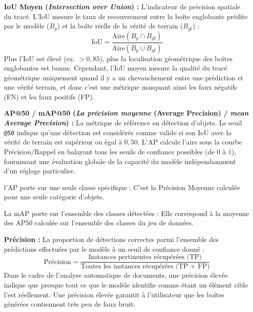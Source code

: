     \begin{description}
    
        \item \textbf{IoU Moyen (\textit{Intersection over Union}) :} L'indicateur de précision spatiale du tracé. L'IoU mesure le taux de recouvrement entre la boîte englobante prédite par le modèle ($B_p$) et la boîte réelle de la vérité de terrain ($B_{gt}$) :
        \begin{equation*}
            \text{IoU} = \frac{\text{Aire}(B_p \cap B_{gt})}{\text{Aire}(B_p \cup B_{gt})}
        \end{equation*}
        Plus l'IoU est élevé (ex. $> 0{,}85$), plus la localisation géométrique des boîtes englobantes est bonne. Cependant, l'IoU moyen mesure la qualité du tracé géométrique uniquement quand il y a un chevauchement entre une prédiction et une vérité terrain, et donc c'est une métrique masquant ainsi les faux négatifs (FN) et les faux positifs (FP). 

        \item \textbf{AP@50 / mAP@50 (\textit{La précision moyenne} (Average Precision) / \textit{mean Average Precision}) :} La métrique de référence en détection d'objets. Le seuil \texttt{@50} indique qu'une détection est considérée comme valide si son IoU avec la vérité de terrain est supérieur ou égal à $0{,}50$. L'AP calcule l'aire sous la courbe Précision/Rappel en balayant tous les seuils de confiance possibles (de $0$ à $1$), fournissant une évaluation globale de la capacité du modèle indépendamment d'un réglage particulier.
        
        l'AP porte sur une seule classe spécifique : C'est la Précision Moyenne calculée pour une seule catégorie d'objets.
        
        La mAP porte sur l'ensemble des classes détectées : Elle correspond à la moyenne des AP50 calculée sur l'ensemble des classes du jeu de données.

        \item \textbf{Précision :} La proportion de détections correctes parmi l'ensemble des prédictions effectuées par le modèle à un seuil de confiance donné :
        \begin{equation*}
            \text{Précision} = \frac{\text{Instances pertinentes récupérées (TP)}}{\text{Toutes les instances récupérées (TP + FP)}}
        \end{equation*}
        Dans le cadre de l'analyse automatique de documents, une précision élevée indique que presque tout ce que le modèle identifie comme étant un élément cible l'est réellement. Une précision élevée garantit à l'utilisateur que les boîtes générées contiennent très peu de faux bruit.


\end{description}
